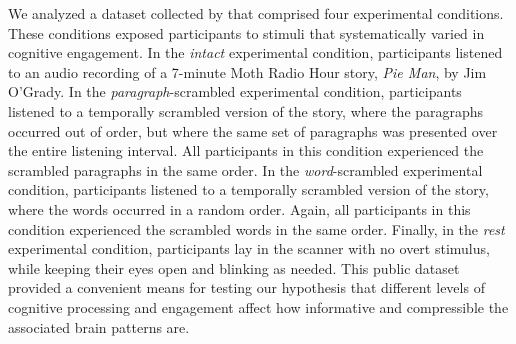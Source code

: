 \documentclass[english, 11pt]{article}
\begin{document}
We analyzed a dataset collected by \cite{SimoEtal16} that comprised four
experimental conditions. These conditions exposed participants to stimuli that
systematically varied in cognitive engagement. In the \textit{intact}
experimental condition, participants listened to an audio recording of a
7-minute Moth Radio Hour story, \textit{Pie Man}, by Jim O'Grady. In the
\textit{paragraph}-scrambled experimental condition, participants listened to a
temporally scrambled version of the story, where the paragraphs occurred out of
order, but where the same set of paragraphs was presented over the entire
listening interval. All participants in this condition experienced the
scrambled paragraphs in the same order. In the \textit{word}-scrambled
experimental condition, participants listened to a temporally scrambled version
of the story, where the words occurred in a random order. Again, all
participants in this condition experienced the scrambled words in the same
order. Finally, in the \textit{rest} experimental condition, participants lay
in the scanner with no overt stimulus, while keeping their eyes open and
blinking as needed. This public dataset provided a convenient means for testing
our hypothesis that different levels of cognitive processing and engagement
affect how informative and compressible the associated brain patterns are.
\end{document}
